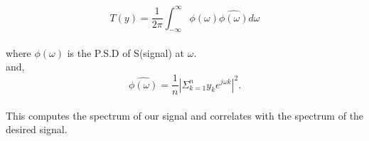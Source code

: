 \documentclass[a4paper,english,12pt]{article}
\begin{document}
\begin{equation*}
T(y)=\frac{1}{2\pi}\int_{-\infty}^{\infty}\phi(\omega)\hat{\phi(\omega)}d\omega
\end{equation*}\\
where $\phi(\omega)$  is the P.S.D of S(signal) at $\omega$.\\
and,
\begin{equation*} \hat{\phi(\omega)}=\frac{1}{n}|\Sigma_{k=1}^{n}y_ke^{j\omega k}|^2.
\end{equation*}\\
This computes the spectrum of our signal and correlates with the spectrum of the desired signal.
\end{document}
